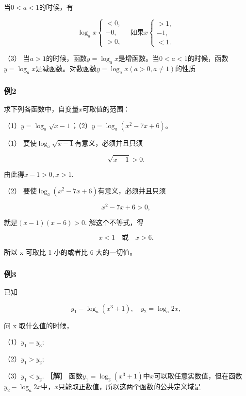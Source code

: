 当\(0 < a < 1\)的时候，有

\[
\log_{a} x \left\{ \begin{array}{ll} < 0, \\ - 0, \\ > 0, \end{array} \right. \quad \text{如果} x \left\{ \begin{array}{ll} > 1, \\ - 1, \\ < 1. \end{array} \right.
\]

（3）
当\(a > 1\)的时候，函数\(y = \log_a x\)是增函数。当\(0 < a < 1\)的时候，函数\(y = \log_a x\)是减函数。对数函数\(y = \log_a x (a > 0, a \neq 1)\)的性质

\subsubsection{例2}

求下列各函数中，自变量\(x\)可取值的范围：

（1）\(y = \log_a \sqrt{x - 1}\)；（2）\(y = \log_a (x^2 - 7x + 6)\)。

 （1） 要使\(\log_a\sqrt{x - 1}\)有意义，必须并且只须

\[
\sqrt{x - 1} > 0.
\]

由此得\(x - 1 > 0, x > 1.\)

（2） 要使\(\log_a(x^2 - 7x + 6)\)有意义，必须并且只须

\[
x^{2} - 7 x + 6 > 0,
\]

就是\((x - 1)(x - 6) > 0.\) 解这个不等式，得

\[
x < 1 \quad \text{或} \quad x > 6.
\]

所以 x 可取比 1 小的或者比 6 大的一切值。

\subsubsection{例3}

已知

\[
y_{1} - \log_{a} (x^{3} + 1), \quad y_{2} = \log_{a} 2 x,
\]

问 x 取什么值的时候，

（1）\(y_{1} = y_{3};\)

（2）\(y_{1} > y_{2};\)

（3）\(y_{1}<y_{2}.\) \textbf{［解］}
函数\(y_{1} = \log_{2}(x^{3} + 1)\)中\(x\)可以取任意实数值，但在函数\(y_{2} - \log_{a}2x\)中，\(x\)只能取正数值，所以这两个函数的公共定义域是

